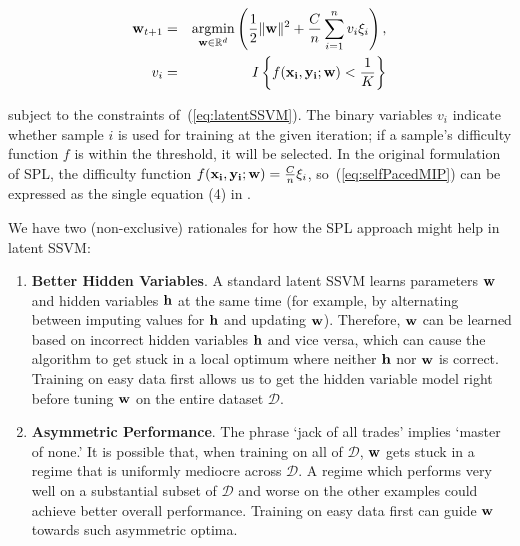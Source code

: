 \documentclass{article}
\newcommand{\argmin}{\operatornamewithlimits{argmin}}
\begin{document}
\begin{eqnarray}
{\bf w}_{t+1} &=& \argmin_{{\bf w} \in \mathbb{R}^d}
\left(\frac{1}{2}\|{\bf w}\|^2 + \frac{C}{n}\sum_{i=1}^n v_i \xi_i\right), \nonumber \\
{v}_i &=& I \left\{ f({\bf x_i},{\bf y_i};{\bf w}) < \frac{1}{K} \right\}
\label{eq:selfPacedMIP}
\end{eqnarray}

subject to the constraints of~(\ref{eq:latentSSVM}). The binary variables $v_i$ indicate whether sample $i$ is used for training at the given iteration; if a sample's difficulty function $f$ is within the threshold, it will be selected.  In the original formulation of SPL, the difficulty function $f({\bf x_i, \bf y_i; \bf w}) = \frac{C}{n}\xi_i$, so~(\ref{eq:selfPacedMIP}) can be expressed as the single equation (4) in \cite{SPL}.



We have two (non-exclusive) rationales for how the SPL approach might help in latent SSVM:

\begin{enumerate}
\item \textbf{Better Hidden Variables}.  A standard latent SSVM learns parameters $\bf w$ and hidden variables $\bf h$ at the same time (for example, by alternating between imputing values for $\bf h$ and updating $\bf w$).  Therefore, $\bf w$ can be learned based on incorrect hidden variables $\bf h$ and vice versa, which can cause the algorithm to get stuck in a local optimum where neither $\bf h$ nor $\bf w$ is correct. Training on easy data first allows us to get the hidden variable model right before tuning $\bf w$ on the entire dataset $\mathcal D$.
\item \textbf{Asymmetric Performance}. The phrase `jack of all trades' implies `master of none.'  It is possible that, when training on all of $\mathcal D$, $\bf w$ gets stuck in a regime that is uniformly mediocre across $\mathcal D$. A regime which performs very well on a substantial subset of $\mathcal D$ and worse on the other examples could achieve better overall performance. Training on easy data first can guide $\bf w$ towards such asymmetric optima.
\end{enumerate}
\end{document}
